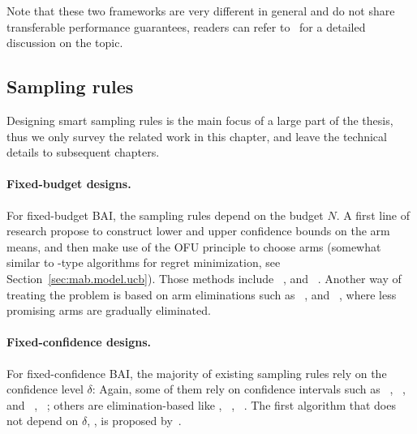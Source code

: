 \begin{remark}
\begin{leftbar}[remarkbar]\label{remark:mab.two_frameworks}
Note that these two frameworks are very different in general and do not share transferable performance guarantees, readers can refer to~\cite{carpentier2016budget} for a detailed discussion on the topic.
\end{leftbar}
\end{remark}

\subsection{Sampling rules}\label{sec:mab.bai.sampling}

Designing smart sampling rules is the main focus of a large part of the thesis, thus we only survey the related work in this chapter, and leave the technical details to subsequent chapters.

\paragraph{Fixed-budget designs.}

For fixed-budget BAI, the sampling rules depend on the budget $N$. A first line of research propose to construct lower and upper confidence bounds on the arm means, and then make use of the OFU principle to choose arms (somewhat similar to \UCB-type algorithms for regret minimization, see Section~\ref{sec:mab.model.ucb}). Those methods include \UCBE~\citep{audibert2010budget}, and \UGapE~\citep{gabillon2012ugape}. Another way of treating the problem is based on arm eliminations such as \SR~\citep{audibert2010budget}, and \SHA~\citep{karnin2013sha}, where less promising arms are gradually eliminated.

\paragraph{Fixed-confidence designs.}

For fixed-confidence BAI, the majority of existing sampling rules rely on the confidence level $\delta$: Again, some of them rely on confidence intervals such as \LUCB~\citep{kalyanakrishnan2012lucb}, \UGapE~\citep{gabillon2012ugape}, \KLLUCB and \KLRacing~\citep{kaufmann2013kl}, \LIL~\citep{jamieson2014lilucb}; others are elimination-based like \SE, \ME~\citep{even-dar2003confidence}, \EGE~\citep{karnin2013sha}. The first algorithm that does not depend on $\delta$, \Track, is proposed by~\cite{garivier2016tracknstop}.

